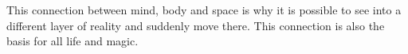 This connection between mind, body and space is why it is possible to see into a different layer of reality and suddenly move there. This connection is also the basis for all life and magic. 

























